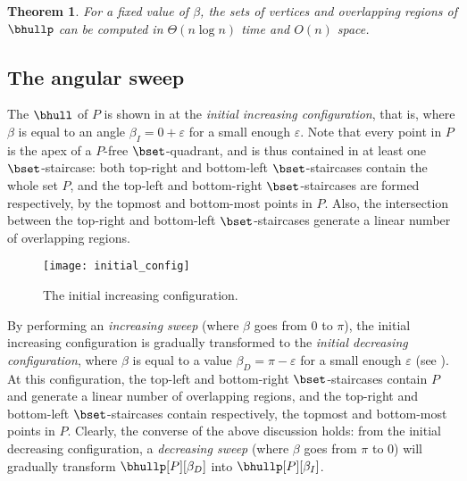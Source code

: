\documentclass[11pt,letterpaper,english]{article}
\newtheorem{theorem}{Theorem}
\theoremstyle{definition}
\begin{document}
\begin{theorem}\label{intro:thm:fixed_computation}
  For a fixed value of $\beta$, the sets of vertices and overlapping
  regions of $\bhullp$ can be computed in $\Theta(n \log n)$ time and
  $O(n)$ space.
\end{theorem}

\subsection{The angular sweep}\label{sec:bhull:sweep}

The $\bhull$ of $P$ is shown in  at the
\emph{initial increasing configuration}, that is, where $\beta$ is
equal to an angle $\beta_I = 0 + \varepsilon$ for a small enough
$\varepsilon$. Note that every point in $P$ is the apex of a $P$-free
$\bset$-quadrant, and is thus contained in at least one
$\bset$-staircase: both top-right and bottom-left $\bset$-staircases
contain the whole set $P$, and the top-left and bottom-right
$\bset$-staircases are formed respectively, by the topmost and
bottom-most points in $P$. Also, the intersection between the
top-right and bottom-left $\bset$-staircases generate a linear number
of overlapping regions.

\begin{figure}[ht]
  \centering
  \begin{minipage}{0.9\textwidth}
    \centering
    \texttt{[image: initial\_config]}
    \caption{The initial increasing configuration.}
    \label{bhull:fig:initial_config}
  \end{minipage}
\end{figure}

By performing an \emph{increasing sweep} (where $\beta$ goes from $0$
to $\pi$), the initial increasing configuration is gradually
transformed to the \emph{initial decreasing configuration}, where
$\beta$ is equal to a value $\beta_D = \pi - \varepsilon$ for a small
enough $\varepsilon$ (see ). At this
configuration, the top-left and bottom-right $\bset$-staircases
contain $P$ and generate a linear number of overlapping regions, and
the top-right and bottom-left $\bset$-staircases contain respectively,
the topmost and bottom-most points in $P$. Clearly, the converse of
the above discussion holds: from the initial decreasing configuration,
a \emph{decreasing sweep} (where $\beta$ goes from $\pi$ to $0$) will
gradually transform $\bhullp[P][\beta_D]$ into $\bhullp[P][\beta_I]$.
\end{document}
